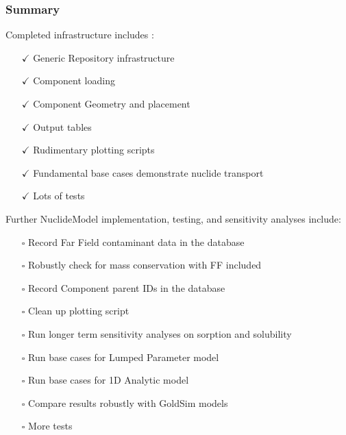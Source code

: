 \begin{frame}[ctb!]
  \frametitle{Summary}
  Completed infrastructure includes :
  \begin{itemize}
  \item[$\checkmark$] Generic Repository infrastructure 
  \item[$\checkmark$] Component loading
  \item[$\checkmark$] Component Geometry and placement
  \item[$\checkmark$] Output tables
  \item[$\checkmark$] Rudimentary plotting scripts
  \item[$\checkmark$] Fundamental base cases demonstrate nuclide transport 
  \item[$\checkmark$] Lots of tests
  \end{itemize}
  Further NuclideModel implementation, testing, and sensitivity analyses 
  include:
  \begin{itemize}
  \item[$\square$] Record Far Field contaminant data in the database 
  \item[$\square$] Robustly check for mass conservation with FF included 
  \item[$\square$] Record Component parent IDs in the database
  \item[$\square$] Clean up plotting script 
  \item[$\square$] Run longer term sensitivity analyses on sorption and solubility 
  \item[$\square$] Run base cases for Lumped Parameter model
  \item[$\square$] Run base cases for 1D Analytic model
  \item[$\square$] Compare results robustly with GoldSim models
  \item[$\square$] More tests
  \end{itemize}

\end{frame}

